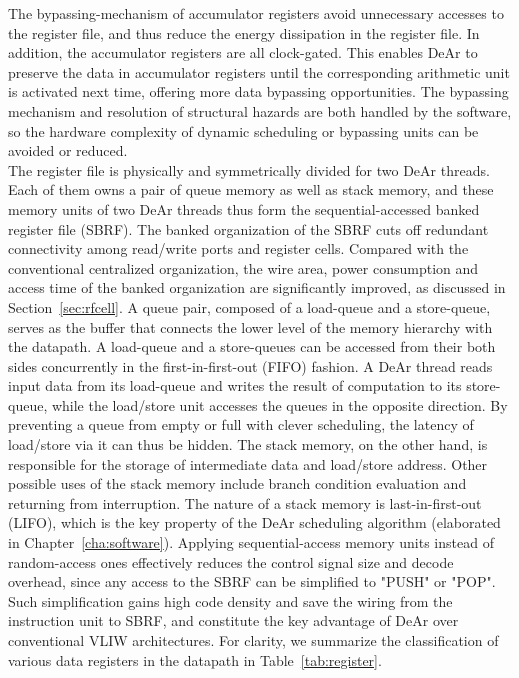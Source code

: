 The bypassing-mechanism of accumulator registers avoid unnecessary accesses to the register file, 
and thus reduce the energy dissipation in the register file.
In addition, the accumulator registers are all clock-gated.
This enables DeAr to preserve the data in accumulator registers until the corresponding arithmetic unit is activated next time, 
offering more data bypassing opportunities.
The bypassing mechanism and resolution of structural hazards are both handled by the software, 
so the hardware complexity of dynamic scheduling or bypassing units can be avoided or reduced.
\\\indent
The register file is physically and symmetrically divided for two DeAr threads.
Each of them owns a pair of queue memory as well as stack memory, 
and these memory units of two DeAr threads thus form the sequential-accessed banked register file (SBRF).
The banked organization of the SBRF cuts off redundant connectivity among read/write ports and register cells.
Compared with the conventional centralized organization, 
the wire area, power consumption and access time of the banked organization are significantly improved, as discussed in Section~\ref{sec:rfcell}.
A queue pair, composed of a load-queue and a store-queue, 
serves as the buffer that connects the lower level of the memory hierarchy with the datapath.
A load-queue and a store-queues can be accessed from their both sides concurrently in the first-in-first-out (FIFO) fashion.
A DeAr thread reads input data from its load-queue and writes the result of computation to its store-queue, 
while the load/store unit accesses the queues in the opposite direction.
By preventing a queue from empty or full with clever scheduling, the latency of load/store via it can thus be hidden.
The stack memory, on the other hand, is responsible for the storage of intermediate data and load/store address.
Other possible uses of the stack memory include branch condition evaluation and returning from interruption.
The nature of a stack memory is last-in-first-out (LIFO), 
which is the key property of the DeAr scheduling algorithm (elaborated in Chapter~\ref{cha:software}).
Applying sequential-access memory units instead of random-access ones effectively reduces the control signal size and decode overhead, 
since any access to the SBRF can be simplified to "PUSH" or "POP".
Such simplification gains high code density and save the wiring from the instruction unit to SBRF, 
and constitute the key advantage of DeAr over conventional VLIW architectures.
For clarity, we summarize the classification of various data registers in the datapath in Table~\ref{tab:register}.
